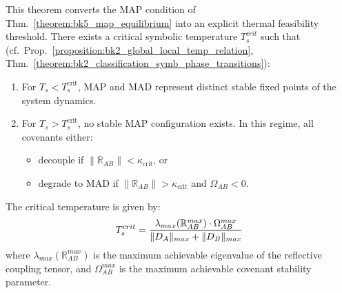 \begin{theorem} \label{theorem:bk5_map_mad_critical_temperature} 
This theorem converts the MAP condition of Thm.~\ref{theorem:bk5_map_equilibrium} into an explicit thermal feasibility threshold.
There exists a critical symbolic temperature $T_s^{crit}$ such that (cf.~Prop.~\ref{proposition:bk2_global_local_temp_relation}, Thm.~\ref{theorem:bk2_classification_symb_phase_transitions}):
\begin{enumerate}
  \item[(i)] For \( T_s < T_s^{\text{crit}} \), MAP and MAD represent distinct stable fixed points of the system dynamics.
  \item[(ii)] For \( T_s > T_s^{\text{crit}} \), no stable MAP configuration exists. 
  In this regime, all covenants either:
  \begin{itemize}
    \item decouple if \( \|\mathbb{R}_{AB}\| < \kappa_{\text{crit}} \), or
    \item degrade to MAD if \( \|\mathbb{R}_{AB}\| > \kappa_{\text{crit}} \) and \( \Omega_{AB} < 0 \).
  \end{itemize}
\end{enumerate}
The critical temperature is given by:
\begin{equation}
T_s^{crit} = \frac{\lambda_{max}(\mathbb{R}_{AB}^{max}) \cdot \Omega_{AB}^{max}}{\|D_A\|_{max} + \|D_B\|_{max}}
\end{equation}
\noindent where $\lambda_{max}(\mathbb{R}_{AB}^{max})$ is the maximum achievable eigenvalue of the reflective coupling tensor, and $\Omega_{AB}^{max}$ is the maximum achievable covenant stability parameter.
\end{theorem}
